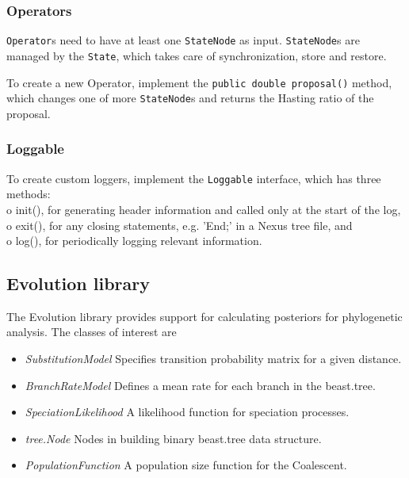 \documentclass{article}
\begin{document}
\subsubsection{Operators\label{ssec.oper}}

{\tt Operator}s need to have at least one {\tt StateNode} as input.
{\tt StateNode}s are managed by the {\tt State}, which takes care of synchronization,
store and restore.

To create a new Operator, implement the {\tt public double proposal()} method, 
which changes one of more {\tt StateNode}s and returns the Hasting ratio of the proposal.

%
%

\subsubsection{Loggable\label{ssec.logger}}

To create custom loggers, implement the {\tt Loggable} interface, which has three methods:\\
o init(), for generating header information and called only at the start of the log,\\
o exit(), for any closing statements, e.g. 'End;' in a Nexus tree file, and\\
o log(), for periodically logging relevant information.



\subsection{Evolution library\label{ssec.evo}}

The Evolution library provides support for calculating posteriors for
phylogenetic analysis. The classes of interest are
\begin{itemize}
\item{\em SubstitutionModel} Specifies transition probability matrix for a given distance.
\item{\em BranchRateModel} Defines a mean rate for each branch in the beast.tree.
\item{\em SpeciationLikelihood} A likelihood function for speciation processes.
\item{\em tree.Node} Nodes in building binary beast.tree data structure.
\item{\em PopulationFunction} A population size function for the Coalescent.
\end{itemize}
\end{document}
